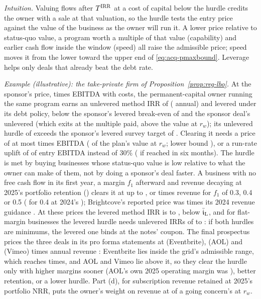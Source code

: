 \noindent\emph{Intuition.} Valuing flows after $T^{\rm IRR}$ at a cost of capital below the hurdle credits the owner with a sale at that valuation, so the hurdle tests the entry price against the value of the business as the owner will run it. A lower price relative to status-quo value, a program worth a multiple of that value (capability) and earlier cash flow inside the window (speed) all raise the admissible price; speed moves it from the lower toward the upper end of \eqref{eq:acq-pmaxbound}. Leverage helps only deals that already beat the debt rate.

\noindent\emph{Example (illustrative): the take-private firm of Proposition~\ref{prop:reg-lbo}.} At the sponsor's price, \acqTpPrice{} times EBITDA with costs, the permanent-capital owner running the same program earns an unlevered method IRR of \acqTpIm{} (\acqTpImAnn{} annual) and \acqTpIl{} levered under its debt policy, below the sponsor's levered break-even of \acqTpBe{} and the sponsor deal's unlevered \acqTpIuSp{} (which exits at the multiple paid, above the value at $r_w$); its unlevered hurdle of \acqIrrU{} exceeds the sponsor's levered survey target of \acqIrrPe. Clearing it needs a price of at most \acqTpPmaxM{} times EBITDA (\acqTpPmaxShare{} of the plan's value at $r_w$; lower bound \acqBoundFac), or a run-rate uplift of \acqTpUplift{} of entry EBITDA instead of 30\% (\acqTpUpliftFast{} if reached in six months). The hurdle is met by buying businesses whose status-quo value is low relative to what the owner can make of them, not by doing a sponsor's deal faster. A business with no free cash flow in its first year, a margin $f_1$ afterward and revenue decaying at 2025's portfolio retention (\acqNrrTwentyFive) clears it at up to \acqGridMthreeA, \acqGridMfourA{} or \acqGridMfiveA{} times revenue for $f_1$ of 0.3, 0.4 or 0.5 (\acqGridMfourB{} for 0.4 at 2024's \acqNrrTwentyFour); Brightcove's reported price was \acqBcPs{} times its 2024 revenue guidance \citep{streamingmedia2024brightcove}. At these prices the levered method IRR is \acqGridLevMin{} to \acqGridLevMax, below $\bar{\mathfrak i}_{\rm L}$, and for flat-margin businesses the levered hurdle needs unlevered IRRs of \acqUnlForLMin{} to \acqUnlForLMax: if both hurdles are minimums, the levered one binds at the notes' coupon. The final prospectus prices the three deals in its pro forma statements at \acqKEb{} (Eventbrite), \acqKAol{} (AOL) and \acqKVim{} (Vimeo) times annual revenue \citep{bendingspoons2026prospectus}: Eventbrite lies inside the grid's admissible range, which reaches \acqGridMax{} times, and AOL and Vimeo lie above it, so they clear the hurdle only with higher margins sooner (AOL's own 2025 operating margin was \acqAolOpm), better retention, or a lower hurdle. Part (d), for subscription revenue retained at 2025's portfolio NRR, puts the owner's weight on revenue at \acqXgRatio{} of a going concern's at $r_w$.


